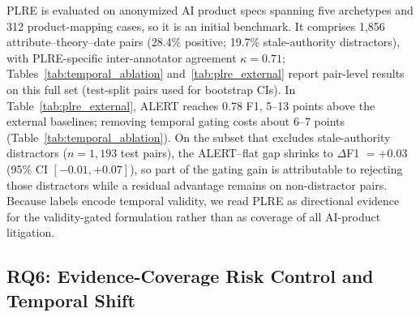 PLRE is evaluated on anonymized AI product specs spanning five archetypes and 312 product-mapping cases, so it is an initial benchmark. It comprises 1{,}856 attribute--theory--date pairs (28.4\% positive; 19.7\% stale-authority distractors), with PLRE-specific inter-annotator agreement $\kappa=0.71$; Tables~\ref{tab:temporal_ablation} and~\ref{tab:plre_external} report pair-level results on this full set (test-split pairs used for bootstrap CIs). In Table~\ref{tab:plre_external}, ALERT reaches 0.78 F1, 5--13 points above the external baselines; removing temporal gating costs about 6--7 points (Table~\ref{tab:temporal_ablation}). On the subset that excludes stale-authority distractors ($n{=}1{,}193$ test pairs), the ALERT--flat gap shrinks to $\Delta$F1 ${=}{+}0.03$ (95\% CI $[{-}0.01,{+}0.07]$), so part of the gating gain is attributable to rejecting those distractors while a residual advantage remains on non-distractor pairs. Because labels encode temporal validity, we read PLRE as directional evidence for the validity-gated formulation rather than as coverage of all AI-product litigation.

\begin{table}[t]
\centering
\caption{PLRE comparison including external legal-NLI/precedent-retrieval baselines. External baselines do not use ALERT's goal predicate or validity-interval closure. Point estimates without confidence intervals.}
\label{tab:plre_external}
\small
\setlength{\tabcolsep}{4pt}
\end{table}

\subsection{RQ6: Evidence-Coverage Risk Control and Temporal Shift}

